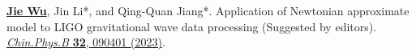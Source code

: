 \begin{cvpublications}
\begin{pubitems}
\item \textbf{\underline{Jie Wu}}, Jin Li*, and Qing-Quan Jiang*. Application of Newtonian approximate model to LIGO gravitational wave data processing (Suggested by editors). \href{https://cpb.iphy.ac.cn/EN/10.1088/1674-1056/acd8a3}{\textit{Chin.Phys.B} \textbf{32}, 090401 (2023)}.
\end{pubitems}
\end{cvpublications}


